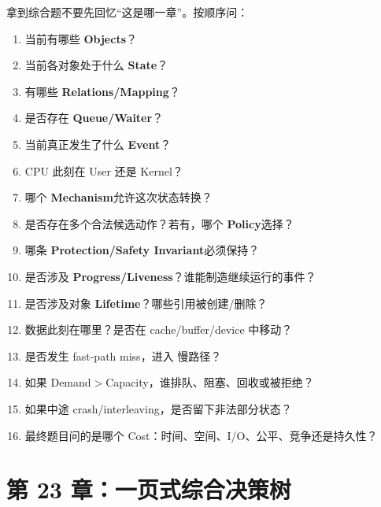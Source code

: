 \documentclass[11pt,a4paper]{ctexart}
\newcommand{\kw}[1]{\textbf{#1}}
\begin{document}
拿到综合题不要先回忆“这是哪一章”。按顺序问：
\begin{enumerate}
  \item 当前有哪些 \kw{Objects}？
  \item 当前各对象处于什么 \kw{State}？
  \item 有哪些 \kw{Relations/Mapping}？
  \item 是否存在 \kw{Queue/Waiter}？
  \item 当前真正发生了什么 \kw{Event}？
  \item CPU 此刻在 User 还是 Kernel？
  \item 哪个 \kw{Mechanism}允许这次状态转换？
  \item 是否存在多个合法候选动作？若有，哪个 \kw{Policy}选择？
  \item 哪条 \kw{Protection/Safety Invariant}必须保持？
  \item 是否涉及 \kw{Progress/Liveness}？谁能制造继续运行的事件？
  \item 是否涉及对象 \kw{Lifetime}？哪些引用被创建/删除？
  \item 数据此刻在哪里？是否在 cache/buffer/device 中移动？
  \item 是否发生 fast-path miss，进入 慢路径？
  \item 如果 Demand$>$Capacity，谁排队、阻塞、回收或被拒绝？
  \item 如果中途 crash/interleaving，是否留下非法部分状态？
  \item 最终题目问的是哪个 Cost：时间、空间、I/O、公平、竞争还是持久性？
\end{enumerate}

\section{第 23 章：一页式综合决策树}
\end{document}
